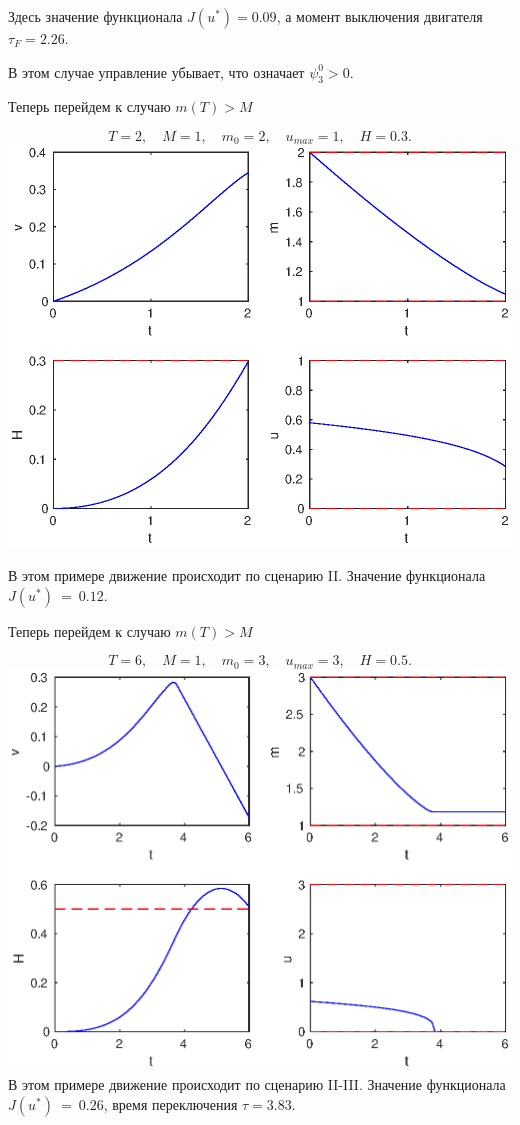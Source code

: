 \documentclass[16pt]{article}
\begin{document}
Здесь значение функционала $J(u^*) = 0.09$, а момент выключения двигателя $\tau_F = 2.26$.

В этом случае управление убывает, что означает $\psi_3^0 > 0$.

\newpage
Теперь перейдем к случаю $m(T) > M$

$$T = 2, \quad M = 1, \quad m_0 = 2, \quad u_{max} = 1, \quad H = 0.3.$$
\includegraphics[width=160mm]{2.eps}

В этом примере движение происходит по сценарию II. Значение функционала $J(u^*)~=~0.12$.

\newpage
Теперь перейдем к случаю $m(T) > M$

$$T = 6, \quad M = 1, \quad m_0 = 3, \quad u_{max} = 3, \quad H = 0.5.$$
\includegraphics[width=160mm]{23.eps}
В этом примере движение происходит по сценарию II-III. Значение функционала $J(u^*)~=~0.26$, время переключения
$\tau = 3.83$.
\end{document}
